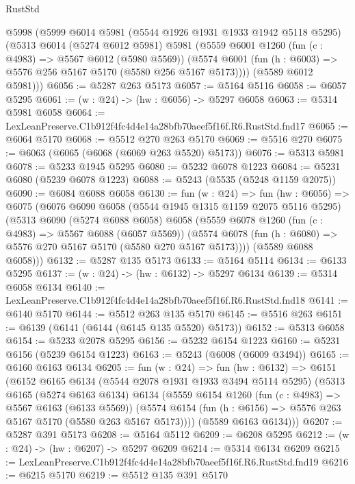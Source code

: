 \begin{lexlean}{RustStd}
\begin{coremodule}
  @5998
    (@5999
      @6014
      @5981
      (@5544 @1926 @1931 @1933 @1942 @5118 @5295)
      (@5313
        @6014
        (@5274 @6012 @5981)
        @5981
        (@5559
          @6001
          @1260
          (fun (c : @4983) => @5567 @6012 (@5980 @5569))
          (@5574 @6001 (fun (h : @6003) => @5576 @256 @5167 @5170 (@5580 @256 @5167 @5173))))
        (@5589 @6012 @5981)))
@6056 := @5287 @263 @5173
@6057 := @5164 @5116
@6058 := @6057 @5295
@6061 := (w : @24) -> (hw : @6056) -> @5297 @6058
@6063 := @5314 @5981 @6058
@6064 := LexLeanPreserve.C1b912f4fc4d4e14a28bfb70aeef5f16f.R6.RustStd.fnd17
@6065 := @6064 @5170
@6068 := @5512 @270 @263 @5170
@6069 := @5516 @270
@6075 := @6063 (@6065 (@6068 (@6069 @263 @5520) @5173))
@6076 := @5313 @5981
@6078 := @5233 @1945 @5295
@6080 := @5232 @6078 @1223
@6084 := @5231 @6080 (@5239 @6078 @1223)
@6088 := @5243 (@5535 (@5248 @1159 @2075))
@6090 := @6084 @6088 @6058
@6130 := fun (w : @24) =>
  fun (hw : @6056) =>
  @6075
    (@6076
      @6090
      @6058
      (@5544 @1945 @1315 @1159 @2075 @5116 @5295)
      (@5313
        @6090
        (@5274 @6088 @6058)
        @6058
        (@5559
          @6078
          @1260
          (fun (c : @4983) => @5567 @6088 (@6057 @5569))
          (@5574 @6078 (fun (h : @6080) => @5576 @270 @5167 @5170 (@5580 @270 @5167 @5173))))
        (@5589 @6088 @6058)))
@6132 := @5287 @135 @5173
@6133 := @5164 @5114
@6134 := @6133 @5295
@6137 := (w : @24) -> (hw : @6132) -> @5297 @6134
@6139 := @5314 @6058 @6134
@6140 := LexLeanPreserve.C1b912f4fc4d4e14a28bfb70aeef5f16f.R6.RustStd.fnd18
@6141 := @6140 @5170
@6144 := @5512 @263 @135 @5170
@6145 := @5516 @263
@6151 := @6139 (@6141 (@6144 (@6145 @135 @5520) @5173))
@6152 := @5313 @6058
@6154 := @5233 @2078 @5295
@6156 := @5232 @6154 @1223
@6160 := @5231 @6156 (@5239 @6154 @1223)
@6163 := @5243 (@6008 (@6009 @3494))
@6165 := @6160 @6163 @6134
@6205 := fun (w : @24) =>
  fun (hw : @6132) =>
  @6151
    (@6152
      @6165
      @6134
      (@5544 @2078 @1931 @1933 @3494 @5114 @5295)
      (@5313
        @6165
        (@5274 @6163 @6134)
        @6134
        (@5559
          @6154
          @1260
          (fun (c : @4983) => @5567 @6163 (@6133 @5569))
          (@5574 @6154 (fun (h : @6156) => @5576 @263 @5167 @5170 (@5580 @263 @5167 @5173))))
        (@5589 @6163 @6134)))
@6207 := @5287 @391 @5173
@6208 := @5164 @5112
@6209 := @6208 @5295
@6212 := (w : @24) -> (hw : @6207) -> @5297 @6209
@6214 := @5314 @6134 @6209
@6215 := LexLeanPreserve.C1b912f4fc4d4e14a28bfb70aeef5f16f.R6.RustStd.fnd19
@6216 := @6215 @5170
@6219 := @5512 @135 @391 @5170

\end{coremodule}
\end{lexlean}
